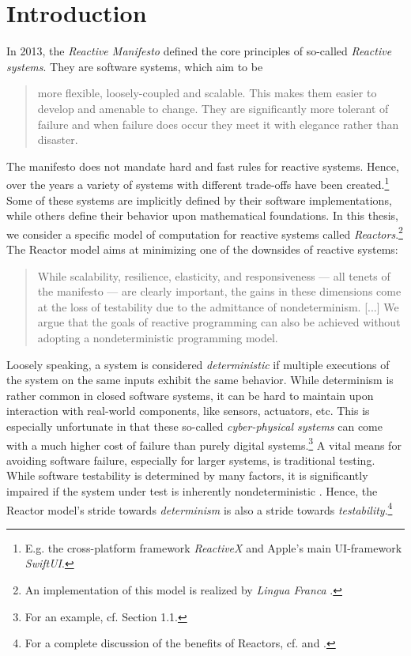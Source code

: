 \section{Introduction}
\label{section:intro-reactors}

In 2013, the \emph{Reactive Manifesto} \cite{manifest} defined the core principles of so-called \emph{Reactive systems}.
They are software systems, which aim to be

\begin{quote}
more flexible, loosely-coupled and scalable. 
This makes them easier to develop and amenable to change. 
They are significantly more tolerant of failure and when failure does occur they meet it with elegance rather than disaster.\hfill \cite{manifest}
\end{quote}

\noindent The manifesto does not mandate hard and fast rules for reactive systems.
Hence, over the years a variety of systems with different trade-offs have been created.\footnote{
    E.g. the cross-platform framework \emph{ReactiveX} and Apple's main UI-framework \emph{SwiftUI}.
}
Some of these systems are implicitly defined by their software implementations, while others define their behavior upon mathematical foundations.
In this thesis, we consider a specific model of computation for reactive systems called \emph{Reactors}.\footnote{
    An implementation of this model is realized by \emph{Lingua Franca} \cite{lf}.
}
The Reactor model aims at minimizing one of the downsides of reactive systems:

\begin{quote}
While scalability, resilience, elasticity, and responsiveness --- all tenets of the manifesto --- are clearly important, the gains in these dimensions come at the loss of testability due to the admittance of nondeterminism.
[...] We argue that the goals of reactive programming can also be achieved without adopting a nondeterministic programming model.\hfill \cite{cyphy}
\end{quote}

\noindent Loosely speaking, a system is considered \emph{deterministic} if multiple executions of the system on the same inputs exhibit the same behavior.
While determinism is rather common in closed software systems, it can be hard to maintain upon interaction with real-world components, like sensors, actuators, etc.
This is especially unfortunate in that these so-called \emph{cyber-physical systems} can come with a much higher cost of failure than purely digital systems.\footnote{
    For an example, cf. \cite{cyphy} Section 1.1.
}
A vital means for avoiding software failure, especially for larger systems, is traditional testing.
While software testability is determined by many factors, it is significantly impaired if the system under test is inherently nondeterministic \cite[p.~7]{marten}. 
Hence, the Reactor model's stride towards \emph{determinism} is also a stride towards \emph{testability}.\footnote{
    For a complete discussion of the benefits of Reactors, cf. \cite{cyphy} and \cite{marten}.
}

